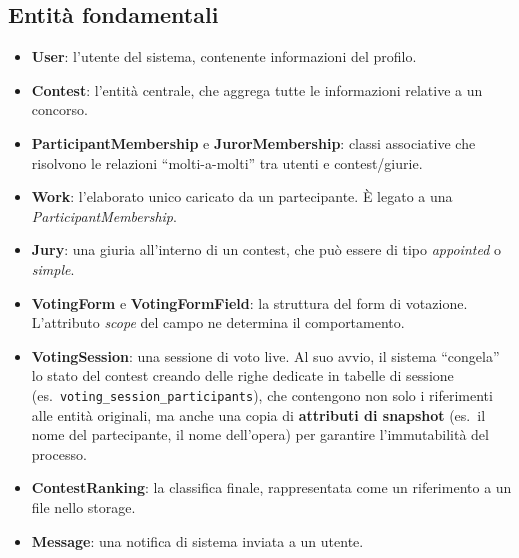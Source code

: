 \subsection{Entità fondamentali}\label{subsec:entita-fondamentali}
\begin{itemize}
    \item \textbf{User}: l'utente del sistema, contenente informazioni del profilo.
    \item \textbf{Contest}: l'entità centrale, che aggrega tutte le informazioni relative a un concorso.
    \item \textbf{ParticipantMembership} e \textbf{JurorMembership}: classi associative che risolvono le relazioni ``molti-a-molti'' tra utenti e contest/giurie.
    \item \textbf{Work}: l'elaborato unico caricato da un partecipante.
    È legato a una \emph{ParticipantMembership}.
    \item \textbf{Jury}: una giuria all'interno di un contest, che può essere di tipo \emph{appointed} o \emph{simple}.
    \item \textbf{VotingForm} e \textbf{VotingFormField}: la struttura del form di votazione.
    L'attributo \emph{scope} del campo ne determina il comportamento.
    \item \textbf{VotingSession}: una sessione di voto live.
    Al suo avvio, il sistema ``congela'' lo stato del contest creando delle righe dedicate in tabelle di sessione (es.\ \texttt{voting\_session\_participants}), che contengono non solo i riferimenti alle entità originali, ma anche una copia di \textbf{attributi di snapshot} (es.\ il nome del partecipante, il nome dell'opera) per garantire l'immutabilità del processo.
    \item \textbf{ContestRanking}: la classifica finale, rappresentata come un riferimento a un file nello storage.
    \item \textbf{Message}: una notifica di sistema inviata a un utente.
\end{itemize}

